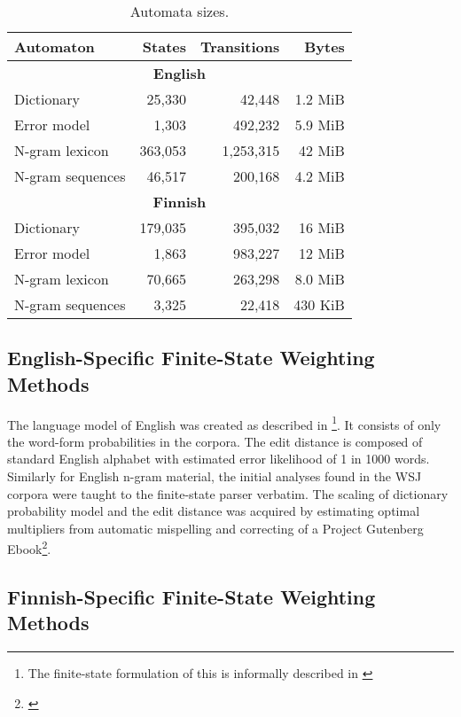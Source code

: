 \documentclass{llncs}
\begin{document}
\begin{table}
\caption{Automata sizes\label{table:sizes}.}
\begin{centering}
\begin{tabular}{lrrr}
    Automaton & States & Transitions & Bytes \\
    \hline
    \multicolumn{4}{c}{\textbf{English}} \\
    \hline
    Dictionary & 25,330 & 42,448 & 1.2 MiB \\
    Error model & 1,303 & 492,232 & 5.9 MiB \\
    N-gram lexicon & 363,053 & 1,253,315 & 42 MiB \\
    N-gram sequences & 46,517 & 200,168 & 4.2 MiB \\
    \hline
    \multicolumn{4}{c}{\textbf{Finnish}} \\
    \hline
    Dictionary & 179,035 & 395,032 & 16 MiB \\
    Error model & 1,863 & 983,227 & 12 MiB \\
    N-gram lexicon & 70,665 & 263,298 & 8.0 MiB \\
    N-gram sequences & 3,325 & 22,418 & 430 KiB \\
    \hline
\end{tabular}
\end{centering}
\end{table}

\subsection{English-Specific Finite-State Weighting Methods}

The language model of English was created as described in
\cite{norvig/2010}\footnote{The finite-state formulation of this is informally
described in \url{}}.  It consists of only the word-form probabilities in the
corpora. The edit distance is composed of standard English alphabet with
estimated error likelihood of 1 in 1000 words.  Similarly for English n-gram
material, the initial analyses found in the WSJ corpora were taught to the
finite-state parser verbatim. The scaling of dictionary probability model and
the edit distance was acquired by estimating optimal multipliers from automatic
mispelling and correcting of a Project Gutenberg Ebook\footnote{\url{}}.

\subsection{Finnish-Specific Finite-State Weighting Methods}
\end{document}
